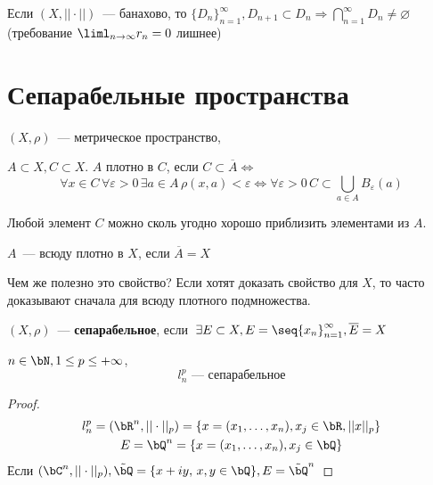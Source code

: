 \documentclass[document]{subfiles}
\begin{document}
\begin{remark}
    Если $(X, || \cdot ||)$~--- банахово, то $\{ D_n \}^\infty_{n=1}, D_{n+1} \subset D_n \Rightarrow \bigcap^\infty_{n=1} D_n \ne \varnothing$  (требование $\liml_{n \to \infty} r_n = 0$ лишнее)
\end{remark}

\section{Сепарабельные пространства}

$(X, \rho)$~--- метрическое пространство,
\begin{definition}[$A$ плотно в $C$]
     $A \subset X, C \subset X$. $A$ плотно в $C$, если $C \subset \overline{A} \Leftrightarrow$
    \[ \forall x \in C \, \forall \varepsilon > 0 \, \exists a \in A \, \rho(x,a) < \varepsilon \Leftrightarrow \forall \varepsilon > 0 \, C \subset \bigcup_{a \in A} B_{\varepsilon}(a) \]
\end{definition}

Любой элемент $C$ можно сколь угодно хорошо приблизить элементами из $A$.

\begin{definition}
    $A$~--- всюду плотно в $X$, если $\overline{A} = X$
\end{definition}

Чем же полезно это свойство? Если хотят доказать свойство для $X$, то часто доказывают сначала для всюду плотного 
подмножества.

\begin{definition}
    $(X, \rho)$~--- \textbf{сепарабельное}, если $\, \exists E \subset X, E = \seq{x_n}_{n=1}^\infty, \overline{E} = X$
\end{definition}

\begin{theorem}
    $n \in \bN, 1 \leq p \leq +\infty$, 
    \[l^p_n \text{~--- сепарабельное} \]
\end{theorem}

\begin{proof}
    \begin{gather*}
        l^p_n = ( \bR^n, || \cdot ||_p) = \{ x = (x_1, \ldots, x_n), x_j \in \bR, ||x||_p \} \\
        E = \bQ^n = \{ x = (x_1, \ldots, x_n), x_j \in \bQ \}
    \end{gather*}
    Если $ (\bC^n, || \cdot ||_p), \tilde{\bQ} = \{ x + iy, \, x, y \in \bQ \}, E = \tilde{\bQ}^n$
\end{proof}
\end{document}
